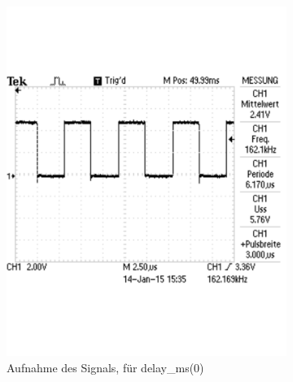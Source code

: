 \documentclass[12pt,a4paper]{article}
\begin{document}
\begin{figure}[H]
\begin{subfigure}[b]{0.28\textwidth}
   \includegraphics[trim = 0mm 50mm 0mm 50mm, clip, width=\textwidth, scale = 0.4]{TEK0012.pdf}
  \caption[Aufnahme des Signals, für delay\_ms(0)]{Aufnahme des Signals, für delay\_ms(0)} 
  \label{fig:g_7}
\end{subfigure}
\hfill
\begin{subfigure}[b]{0.28\textwidth} 	

\end{subfigure}
\end{figure}
\end{document}
